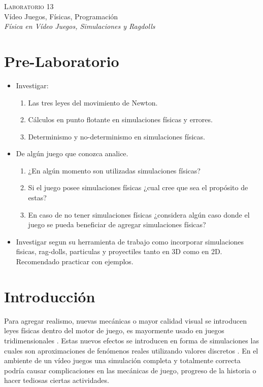 \begin{center}
\textsc{\Large Laboratorio 13}~\\
{\large Vídeo Juegos, Físicas, Programación}~\\
\emph{Física en Vídeo Juegos, Simulaciones y Ragdolls}
\end{center}

\section{Pre-Laboratorio}
\begin{itemize}
\item Investigar:
\begin{enumerate}
  \item Las tres leyes del movimiento de Newton.
  \item Cálculos en punto flotante en simulaciones físicas y errores.
  \item Determinismo y no-determinismo en simulaciones físicas.
\end{enumerate}
\item De algún juego que conozca analice.
\begin{enumerate}
  \item ¿En algún momento son utilizadas simulaciones físicas? 
  \item Si el juego posee simulaciones físicas ¿cual cree que sea el propósito de estas?
  \item En caso de no tener simulaciones físicas ¿considera algún caso donde el juego se pueda beneficiar de agregar simulaciones físicas?
\end{enumerate}
\item Investigar segun su herramienta de trabajo como incorporar simulaciones fisicas, rag-dolls, particulas y proyectiles tanto en 3D como en 2D. Recomendado practicar con ejemplos.
\end{itemize}

\section{Introducción}
Para agregar realismo, nuevas mecánicas o mayor calidad visual se introducen leyes físicas dentro del motor de juego, es mayormente usado en juegos tridimensionales \cite[p.~325]{jenkinscreatinggames}. Estas nuevos efectos se introducen en forma de simulaciones las cuales son aproximaciones de fenómenos reales utilizando valores discretos \cite{ian_gamephysics}. En el ambiente de un vídeo juegos una simulación completa y totalmente correcta podría causar complicaciones en las mecánicas de juego, progreso de la historia o hacer tediosas ciertas actividades.

